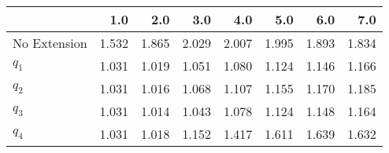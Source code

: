 \begin{tabular}{lrrrrrrr}
\toprule
{} &   1.0 &   2.0 &   3.0 &   4.0 &   5.0 &   6.0 &   7.0 \\
\midrule
No Extension & 1.532 & 1.865 & 2.029 & 2.007 & 1.995 & 1.893 & 1.834 \\
$q_1$        & 1.031 & 1.019 & 1.051 & 1.080 & 1.124 & 1.146 & 1.166 \\
$q_2$        & 1.031 & 1.016 & 1.068 & 1.107 & 1.155 & 1.170 & 1.185 \\
$q_3$        & 1.031 & 1.014 & 1.043 & 1.078 & 1.124 & 1.148 & 1.164 \\
$q_4$        & 1.031 & 1.018 & 1.152 & 1.417 & 1.611 & 1.639 & 1.632 \\
\bottomrule
\end{tabular}
